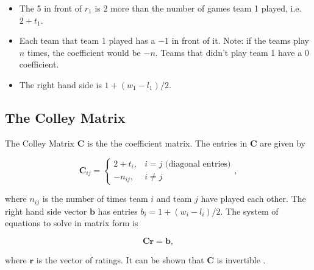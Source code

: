 \documentclass[
]{book}
\theoremstyle{definition}
\theoremstyle{definition}
\theoremstyle{definition}
\theoremstyle{definition}
\theoremstyle{remark}
\begin{document}
\begin{itemize}
\item
  The 5 in front of \(r_1\) is 2 more than the number of games team 1 played, i.e.~\(2+t_1\).
\item
  Each team that team 1 played has a \(-1\) in front of it. Note: if the teams play \(n\) times, the coefficient would be \(-n\). Teams that didn't play team 1 have a 0 coefficient.
\item
  The right hand side is \(1+(w_1-l_1)/2\).
\end{itemize}

\subsection*{The Colley Matrix}\label{the-colley-matrix}

The Colley Matrix \(\mathbf{C}\) is the the coefficient matrix. The entries in \(\mathbf{C}\) are given by

\[\mathbf{C}_{ij}=\begin{cases} 2+t_i,& i=j \text{ (diagonal entries)}\\-n_{ij}, &i\neq j\end{cases},\]

where \(n_{ij}\) is the number of times team \(i\) and team \(j\) have played each other. The right hand side vector \(\mathbf{b}\) has entries \(b_i=1+(w_i-l_i)/2\). The system of equations to solve in matrix form is

\[\mathbf{C}\mathbf{r}=\mathbf{b},\]

where \(\mathbf{r}\) is the vector of ratings. It can be shown that \(\mathbf{C}\) is invertible \autocite{Colley}.
\end{document}
